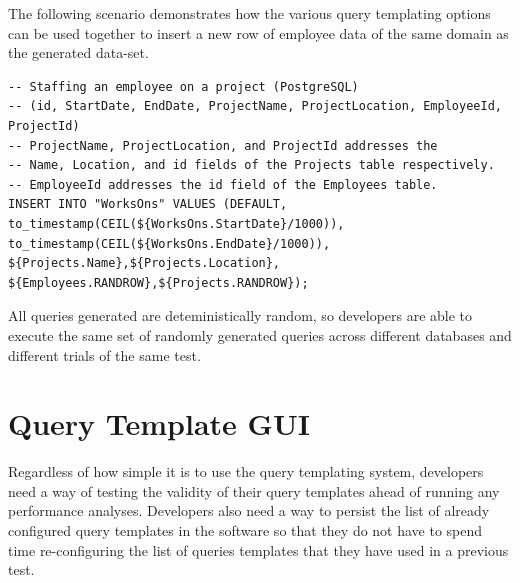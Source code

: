 \documentclass[12pt]{report}
\begin{document}
\begin{spacing}{1.9}
	The following scenario demonstrates how the various query templating options can be used together to insert a new row of employee data of the same domain as the generated data-set.
	
	
	\begin{verbatim}
-- Staffing an employee on a project (PostgreSQL)
-- (id, StartDate, EndDate, ProjectName, ProjectLocation, EmployeeId, ProjectId)
-- ProjectName, ProjectLocation, and ProjectId addresses the 
-- Name, Location, and id fields of the Projects table respectively.
-- EmployeeId addresses the id field of the Employees table.
INSERT INTO "WorksOns" VALUES (DEFAULT, 
to_timestamp(CEIL(${WorksOns.StartDate}/1000)), 
to_timestamp(CEIL(${WorksOns.EndDate}/1000)),
${Projects.Name},${Projects.Location},
${Employees.RANDROW},${Projects.RANDROW});
	\end{verbatim}
	
	
	
	All queries generated are deteministically random, so developers are able to execute the same set of randomly generated queries across different databases and different trials of the same test.
	
	
	
	\section{Query Template GUI}
	
	Regardless of how simple it is to use the query templating system, developers need a way of testing the validity of their query templates ahead of running any performance analyses. Developers also need a way to persist the list of already configured query templates in the software so that they do not have to spend time re-configuring the list of queries templates that they have used in a previous test.
	

\end{spacing}
\end{document}
